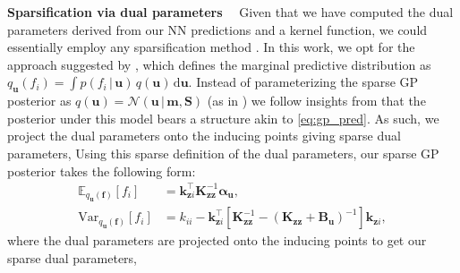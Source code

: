 \documentclass{article}
\renewcommand{\paragraph}[1]{{\bf #1}~~}
\newcommand{\mathbold}[1]{\bm{#1}}
\newcommand{\mbf}[1]{\mathbf{#1}}
\renewcommand{\mid}{\,|\,}
\newcommand{\MS}{\mbf{S}}
\newcommand{\T}{\top}
\newcommand{\valpha}[0]{\mathbold{\alpha}}
\newcommand{\MBeta}[0]{\mathbold{B}}
\newcommand{\vm}{\mbf{m}}
\newcommand{\vf}{\mbf{f}}
\newcommand{\vu}{\mbf{u}}
\newcommand{\MKzz}{\mbf{K}_{\mbf{z}\mbf{z}}}
\newcommand{\vkzs}{\mbf{k}_{\mbf{z}i}}
\newcommand{\myexpect}{\mathbb{E}}
\begin{document}
\paragraph{Sparsification via dual parameters}
\label{sec:sparse-dual-gp}
%
Given that we have computed the dual parameters derived from our NN predictions and a kernel function, we could essentially employ any sparsification method \citep{quinonero2005unifying}.
In this work, we opt for the approach suggested by \citet{titsias2009variational} \citep[also used in the DTC approximation, see][]{quinonero2005unifying}, which defines the marginal predictive distribution as $q_{\vu}(f_i)  = \int p(f_i  \mid \vu) \, q(\vu) \, \mathrm{d}\vu$.
Instead of parameterizing the sparse GP posterior as $q(\vu) = \mathcal{N}\left(\vu \mid \vm, \MS \right)$ (as in \citet{titsias2009variational,hensman2013gaussian})
we follow insights from \citet{adam2021dual} that the posterior under this model bears a structure akin to \cref{eq:gp_pred}.
As such, we project the dual parameters onto the inducing points giving sparse dual parameters,
Using this sparse definition of the dual parameters, our sparse GP posterior takes the following form:
\begin{subequations} \label{eq:dual_sparse_post}
\begin{align}
   \myexpect_{q_{\vu}(\vf)}[f_i] &= \vkzs^{\T} \MKzz^{-1} \valpha_{\vu}, \\
   \textrm{Var}_{q_{\vu}(\vf)}[f_i]  &= k_{ii} - \vkzs^\top [\MKzz^{-1} - (\MKzz + \MBeta_{\vu})^{-1} ]\vkzs, \nonumber
\end{align}
\end{subequations}
where the dual parameters are projected onto the inducing points to get our sparse dual parameters,
\end{document}
